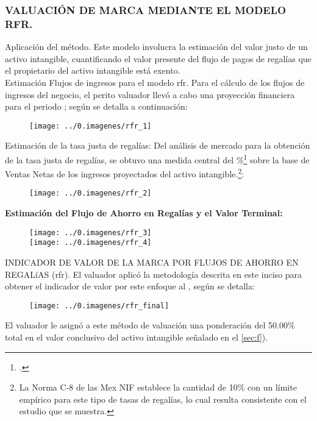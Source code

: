 \subsubsection{VALUACIÓN  DE MARCA MEDIANTE EL MODELO RFR.}

\textcolor{principal}{Aplicación del método}. Este modelo involucra la estimación del valor justo de un activo intangible, cuantificando el valor presente del flujo de pagos de regalías que el propietario del activo intangible está exento.\\

\textcolor{principal}{Estimación Flujos de ingresos para el modelo \gls{rfr}}. Para el cálculo de los flujos de ingresos del negocio, el perito valuador llevó a cabo una proyección financiera para el periodo \periodoProyeccion; según se detalla a continuación:

\begin{figure}[H]
\centering
\texttt{[image: ../0.imagenes/rfr\_1]}
\end{figure}

\textcolor{principal}{Estimación de la tasa justa de regalías:} Del análisis de mercado para la obtención de la tasa justa de regalías, se obtuvo una medida central del \tasaRegalias\%\footnote{\estadisticoTasaRegalias.} sobre la base de Ventas Netas de los ingresos proyectados del activo intangible.\footnote{ La Norma C-8 de las Mex NIF establece la cantidad de 10\% con un límite empírico para este tipo de tasas de regalías, lo cual resulta consistente con el estudio que se muestra.}:

\begin{figure}[H]
\centering
\texttt{[image: ../0.imagenes/rfr\_2]}
\end{figure}

\textcolor{principal}{\textbf{Estimación del Flujo de Ahorro en Regalías y el Valor Terminal:}}

\begin{figure}[H]
\centering
\texttt{[image: ../0.imagenes/rfr\_3]}\\[10pt]

\texttt{[image: ../0.imagenes/rfr\_4]}
\end{figure}

\espacio{1cm}

\textcolor{principal}{INDICADOR DE VALOR DE LA MARCA POR FLUJOS DE AHORRO EN REGALíAS (\gls{rfr})}. El valuador aplicó la metodología descrita en este inciso para obtener el indicador de valor por este enfoque al \textcolor{principal}{\fechaValores}, según se detalla:



\begin{figure}[H]
\centering
\texttt{[image: ../0.imagenes/rfr\_final]}
\end{figure}

El valuador le asign\'o a este m\'etodo de valuaci\'on una ponderaci\'on del 50.00\% total en el valor conclusivo del activo intangible se\~nalado en el \autoref{sec:f}).

